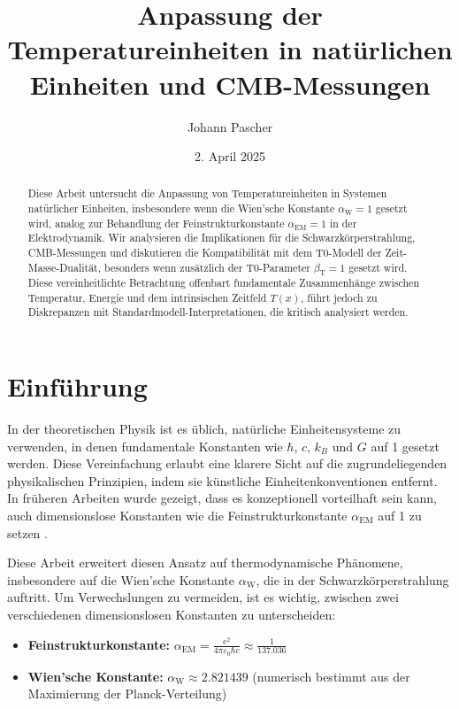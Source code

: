 \documentclass[12pt,a4paper]{article}
\title{Anpassung der Temperatureinheiten in natürlichen Einheiten und CMB-Messungen}
\author{Johann Pascher}
\date{2. April 2025}
\newcommand{\Tfield}{T(x)}
\newcommand{\alphaEM}{\alpha_{\text{EM}}}
\newcommand{\betaT}{\beta_{\text{T}}}
\newcommand{\alphaW}{\alpha_{\text{W}}}
\begin{document}
	
	\maketitle
	
	\begin{abstract}
		Diese Arbeit untersucht die Anpassung von Temperatureinheiten in Systemen natürlicher Einheiten, insbesondere wenn die Wien'sche Konstante \(\alphaW = 1\) gesetzt wird, analog zur Behandlung der Feinstrukturkonstante \(\alphaEM = 1\) in der Elektrodynamik. Wir analysieren die Implikationen für die Schwarzkörperstrahlung, CMB-Messungen und diskutieren die Kompatibilität mit dem T0-Modell der Zeit-Masse-Dualität, besonders wenn zusätzlich der T0-Parameter \(\betaT = 1\) gesetzt wird. Diese vereinheitlichte Betrachtung offenbart fundamentale Zusammenhänge zwischen Temperatur, Energie und dem intrinsischen Zeitfeld \(\Tfield\), führt jedoch zu Diskrepanzen mit Standardmodell-Interpretationen, die kritisch analysiert werden.
	\end{abstract}
	
	\tableofcontents
	
	\section{Einführung}
	
	In der theoretischen Physik ist es üblich, natürliche Einheitensysteme zu verwenden, in denen fundamentale Konstanten wie \(\hbar\), \(c\), \(k_B\) und \(G\) auf 1 gesetzt werden. Diese Vereinfachung erlaubt eine klarere Sicht auf die zugrundeliegenden physikalischen Prinzipien, indem sie künstliche Einheitenkonventionen entfernt. In früheren Arbeiten wurde gezeigt, dass es konzeptionell vorteilhaft sein kann, auch dimensionslose Konstanten wie die Feinstrukturkonstante \(\alphaEM\) auf 1 zu setzen \cite{pascher_alpha_2025}.
	
	Diese Arbeit erweitert diesen Ansatz auf thermodynamische Phänomene, insbesondere auf die Wien'sche Konstante \(\alphaW\), die in der Schwarzkörperstrahlung auftritt. Um Verwechslungen zu vermeiden, ist es wichtig, zwischen zwei verschiedenen dimensionslosen Konstanten zu unterscheiden:
	
	\begin{tcolorbox}[colback=blue!5!white,colframe=blue!75!black,title=Wichtige dimensionslose Konstanten]
		\begin{itemize}
			\item \textbf{Feinstrukturkonstante:} \(\alphaEM = \frac{e^2}{4\pi\varepsilon_0 \hbar c} \approx \frac{1}{137.036}\)
			
			\item \textbf{Wien'sche Konstante:} \(\alphaW \approx 2.821439\) (numerisch bestimmt aus der Maximierung der Planck-Verteilung)
		\end{itemize}
	\end{tcolorbox}
	
\end{document}
